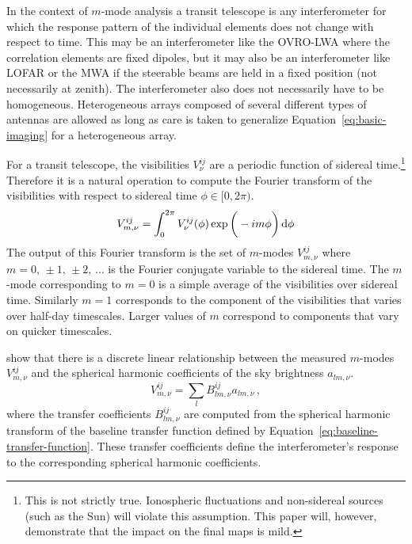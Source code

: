 \documentclass[twocolumn]{aastex61}
\renewcommand{\d}{{\rm d}}
\begin{document}
In the context of $m$-mode analysis a transit telescope is any interferometer for which the response
pattern of the individual elements does not change with respect to time. This may be an
interferometer like the OVRO-LWA where the correlation elements are fixed dipoles, but it may also
be an interferometer like LOFAR or the MWA if the steerable beams are held in a fixed position (not
necessarily at zenith). The interferometer also does not necessarily have to be homogeneous.
Heterogeneous arrays composed of several different types of antennas are allowed as long as care is
taken to generalize Equation~\ref{eq:basic-imaging} for a heterogeneous array.

For a transit telescope, the visibilities $V^{ij}_\nu$ are a periodic function of sidereal
time.\footnote{
    This is not strictly true. Ionospheric fluctuations and non-sidereal sources (such as the Sun)
    will violate this assumption. This paper will, however, demonstrate that the impact on the final
    maps is mild.
}
Therefore it is a natural operation to compute the Fourier transform of the visibilities with
respect to sidereal time $\phi\in[0,2\pi)$.
\begin{equation}
    V^{ij}_{m,\nu} = \int_0^{2\pi} V^{ij}_\nu(\phi)\exp\bigg(-im\phi\bigg)\,\d\phi
\end{equation}
The output of this Fourier transform is the set of $m$-modes $V^{ij}_{m,\nu}$ where
$m=0,\,\pm1,\,\pm2,\,\ldots$ is the Fourier conjugate variable to the sidereal time. The $m$-mode
corresponding to $m=0$ is a simple average of the visibilities over sidereal time. Similarly $m=1$
corresponds to the component of the visibilities that varies over half-day timescales. Larger values
of $m$ correspond to components that vary on quicker timescales.

\citet{2014ApJ...781...57S, 2015PhRvD..91h3514S} show that there is a discrete linear relationship
between the measured $m$-modes $V^{ij}_{m,\nu}$ and the spherical harmonic coefficients of the sky
brightness $a_{lm,\nu}$.
\begin{equation}\label{eq:m-mode-sum-equation}
    V^{ij}_{m,\nu} = \sum_l B^{ij}_{lm,\nu} a_{lm,\nu}\,,
\end{equation}
where the transfer coefficients $B^{ij}_{lm,\nu}$ are computed from the spherical harmonic transform
of the baseline transfer function defined by Equation~\ref{eq:baseline-transfer-function}. These
transfer coefficients define the interferometer's response to the corresponding spherical harmonic
coefficients.
\end{document}

